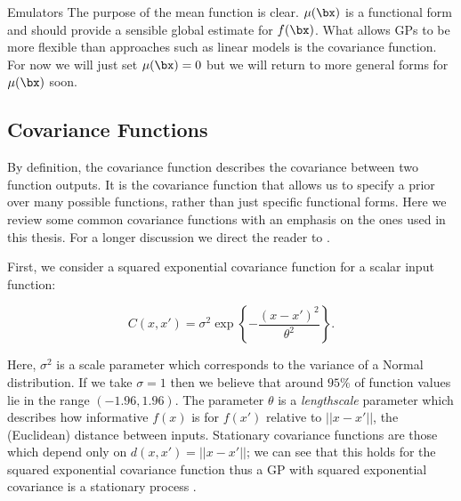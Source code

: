 \begin{chapter}{Emulators \label{Ch:Emulators}}
The purpose of the mean function is clear. $\mu(\bx)$ is a functional form and should provide a sensible global estimate for $f(\bx)$. What allows GPs to be more flexible than approaches such as linear models is the covariance function. For now we will just set $\mu(\bx) = 0$ but we will return to more general forms for $\mu(\bx)$ soon.

\subsection{Covariance Functions}

By definition, the covariance function describes the covariance between two function outputs. It is the covariance function that allows us to specify a prior over many possible functions, rather than just specific functional forms. Here we review some common covariance functions with an emphasis on the ones used in this thesis. For a longer discussion we direct the reader to \citet{Rasmussen2006Gpfm}.

First, we consider a squared exponential covariance function for a scalar input function:

\begin{equation}
  C(x, x') = \sigma^2 \exp\left\{ -\frac{(x - x')^2}{\theta^2} \right\}.
\end{equation}

Here, $\sigma^2$ is a scale parameter which corresponds to the variance of a Normal distribution. If we take $\sigma = 1$ then we believe that around $95\%$ of function values lie in the range $(-1.96,1.96)$. The parameter $\theta$ is a \textit{lengthscale} parameter which describes how informative $f(x)$ is for $f(x')$ relative to $||x - x'||$, the (Euclidean) distance between inputs. Stationary covariance functions are those which depend only on $d(x, x') = ||x - x'||$; we can see that this holds for the squared exponential covariance function thus a GP with squared exponential covariance is a stationary process \citep{Gneiting2002}.


\end{chapter}
